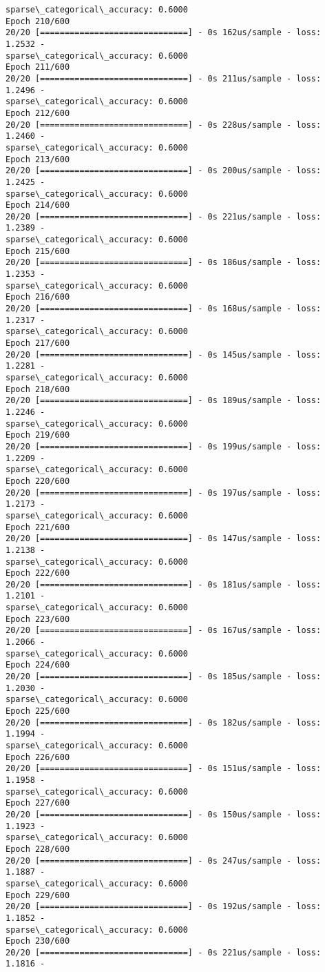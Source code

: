 \documentclass[11pt]{article}
\begin{document}
\begin{Verbatim}[commandchars=\\\{\}]
sparse\_categorical\_accuracy: 0.6000
Epoch 210/600
20/20 [==============================] - 0s 162us/sample - loss: 1.2532 -
sparse\_categorical\_accuracy: 0.6000
Epoch 211/600
20/20 [==============================] - 0s 211us/sample - loss: 1.2496 -
sparse\_categorical\_accuracy: 0.6000
Epoch 212/600
20/20 [==============================] - 0s 228us/sample - loss: 1.2460 -
sparse\_categorical\_accuracy: 0.6000
Epoch 213/600
20/20 [==============================] - 0s 200us/sample - loss: 1.2425 -
sparse\_categorical\_accuracy: 0.6000
Epoch 214/600
20/20 [==============================] - 0s 221us/sample - loss: 1.2389 -
sparse\_categorical\_accuracy: 0.6000
Epoch 215/600
20/20 [==============================] - 0s 186us/sample - loss: 1.2353 -
sparse\_categorical\_accuracy: 0.6000
Epoch 216/600
20/20 [==============================] - 0s 168us/sample - loss: 1.2317 -
sparse\_categorical\_accuracy: 0.6000
Epoch 217/600
20/20 [==============================] - 0s 145us/sample - loss: 1.2281 -
sparse\_categorical\_accuracy: 0.6000
Epoch 218/600
20/20 [==============================] - 0s 189us/sample - loss: 1.2246 -
sparse\_categorical\_accuracy: 0.6000
Epoch 219/600
20/20 [==============================] - 0s 199us/sample - loss: 1.2209 -
sparse\_categorical\_accuracy: 0.6000
Epoch 220/600
20/20 [==============================] - 0s 197us/sample - loss: 1.2173 -
sparse\_categorical\_accuracy: 0.6000
Epoch 221/600
20/20 [==============================] - 0s 147us/sample - loss: 1.2138 -
sparse\_categorical\_accuracy: 0.6000
Epoch 222/600
20/20 [==============================] - 0s 181us/sample - loss: 1.2101 -
sparse\_categorical\_accuracy: 0.6000
Epoch 223/600
20/20 [==============================] - 0s 167us/sample - loss: 1.2066 -
sparse\_categorical\_accuracy: 0.6000
Epoch 224/600
20/20 [==============================] - 0s 185us/sample - loss: 1.2030 -
sparse\_categorical\_accuracy: 0.6000
Epoch 225/600
20/20 [==============================] - 0s 182us/sample - loss: 1.1994 -
sparse\_categorical\_accuracy: 0.6000
Epoch 226/600
20/20 [==============================] - 0s 151us/sample - loss: 1.1958 -
sparse\_categorical\_accuracy: 0.6000
Epoch 227/600
20/20 [==============================] - 0s 150us/sample - loss: 1.1923 -
sparse\_categorical\_accuracy: 0.6000
Epoch 228/600
20/20 [==============================] - 0s 247us/sample - loss: 1.1887 -
sparse\_categorical\_accuracy: 0.6000
Epoch 229/600
20/20 [==============================] - 0s 192us/sample - loss: 1.1852 -
sparse\_categorical\_accuracy: 0.6000
Epoch 230/600
20/20 [==============================] - 0s 221us/sample - loss: 1.1816 -

\end{Verbatim}
\end{document}
